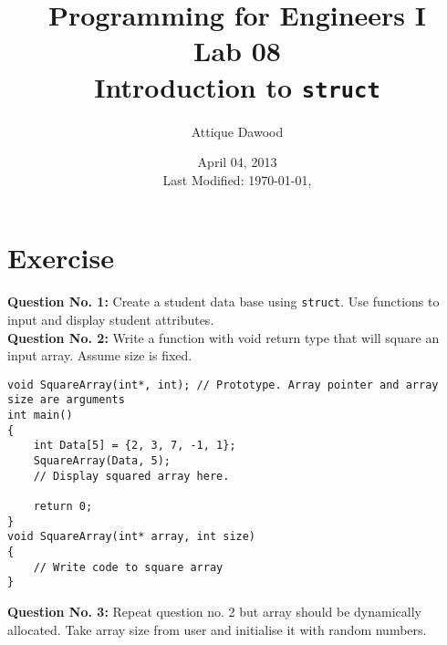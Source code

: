 \documentclass[12pt,a4paper]{article}
\title{\vspace{-1cm}Programming for Engineers I\\Lab 08\\Introduction to \texttt{struct}}
\author{Attique Dawood}
\date{April 04, 2013\\[0.2cm] Last Modified: \today, \currenttime}
\begin{document}
\maketitle
\section{Exercise}
\textbf{Question No. 1:} Create a student data base using \texttt{struct}. Use functions to input and display student attributes.\\
\textbf{Question No. 2:} Write a function with void return type that will square an input array. Assume size is fixed.
\begin{lstlisting}[caption={Square using array pointer}]
void SquareArray(int*, int); // Prototype. Array pointer and array size are arguments
int main()
{
	int Data[5] = {2, 3, 7, -1, 1};
	SquareArray(Data, 5);
	// Display squared array here.

	return 0;
}
void SquareArray(int* array, int size)
{
	// Write code to square array
}
\end{lstlisting}
\textbf{Question No. 3:} Repeat question no. 2 but array should be dynamically allocated. Take array size from user and initialise it with random numbers.
\end{document}
